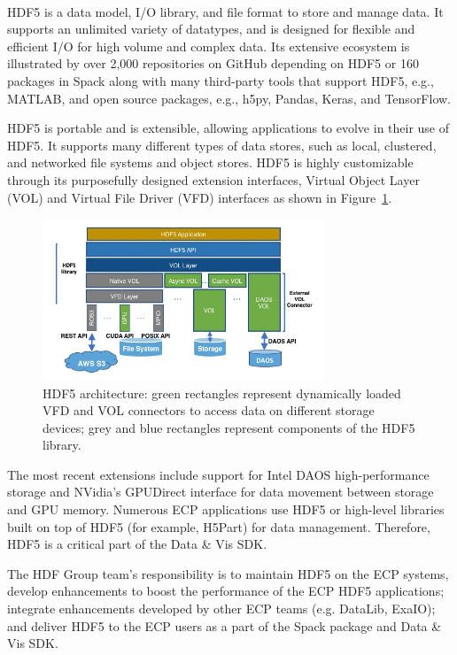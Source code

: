 \paragraph{}
HDF5 is a data model, I/O library, and file format to store and manage data. It supports an unlimited variety of datatypes, and is designed for flexible and efficient I/O for high volume and complex data. Its extensive ecosystem is illustrated by over 2,000 repositories on GitHub depending on HDF5 or 160 packages in Spack along with many third-party tools that support HDF5, e.g., MATLAB, and open source packages, e.g., h5py, Pandas, Keras, and TensorFlow. 

HDF5 is portable and is extensible, allowing applications to evolve in their use of HDF5. It supports many different types of data stores, such as local, clustered, and networked file systems and object stores. HDF5 is highly customizable through its purposefully designed extension interfaces, Virtual Object Layer (VOL) and Virtual File Driver (VFD) interfaces as shown in Figure~\ref{fig:HDF5-Arch}.
\begin{figure}[htb]
    \centering
    \includegraphics[width=0.75\textwidth]{projects/2.3.4-DataViz/2.3.4.01-DataViz-SDK/HDF5-Arch-small.png}
    \caption{\label{fig:HDF5-Arch}
    HDF5 architecture: green rectangles represent dynamically loaded VFD and VOL connectors to access data on different storage devices; grey and blue rectangles represent components of the HDF5 library.}
\end{figure}

 The most recent extensions include support for Intel DAOS high-performance storage and NVidia’s GPUDirect interface for data movement between storage and GPU memory. 
Numerous ECP applications use HDF5 or high-level libraries built on top of HDF5 (for example, H5Part) for data management. Therefore, HDF5 is a critical part of the Data \& Vis SDK. 

The HDF Group team’s responsibility is to maintain HDF5 on the ECP systems, develop enhancements to boost the performance of the ECP HDF5 applications; integrate enhancements developed by other ECP teams (e.g. DataLib, ExaIO); and deliver HDF5  to the ECP users as a part of the Spack package and Data \& Vis SDK. 

